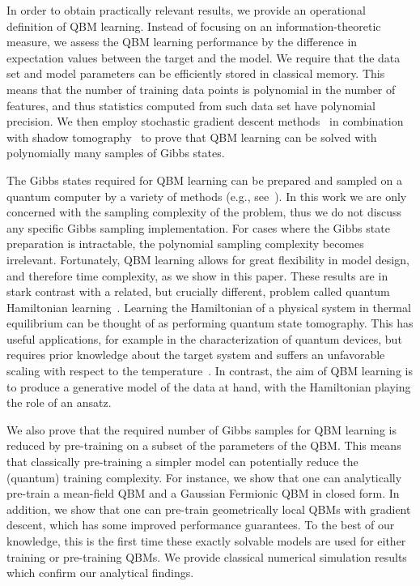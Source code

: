 \documentclass[
    aps,
    prx,
    floatfix,
    nofootinbib,
    onecolumn
]{revtex4-2}
\begin{document}
In order to obtain practically relevant results, we provide an operational definition of QBM learning. Instead of focusing on an information-theoretic measure, we assess the QBM learning performance by the difference in expectation values between the target and the model. We require that the data set and model parameters can be efficiently stored in classical memory. This means that the number of training data points is polynomial in the number of features, and thus statistics computed from such data set have polynomial precision. We then employ stochastic gradient descent methods~\cite{Khaled2020, Garrigos2023} in combination with shadow tomography~\cite{Aaronson_2017, Huang_2021, Rouze_2023} to prove that QBM learning can be solved with polynomially many samples of Gibbs states. 

The Gibbs states required for QBM learning can be prepared and sampled on a quantum computer by a variety of methods (e.g., see~\cite{Temme_2011, Chowdhury_2016, Holmes_2022, chifang2023quantum, zhang2023dissipative, Coopmans_2023}). In this work we are only concerned with the sampling complexity of the problem, thus we do not discuss any specific Gibbs sampling implementation. For cases where the Gibbs state preparation is intractable, the polynomial sampling complexity becomes irrelevant. Fortunately, QBM learning allows for great flexibility in model design, and therefore time complexity, as we show in this paper. These results are in stark contrast with a related, but crucially different, problem called quantum Hamiltonian learning~\cite{Wiebe_2014, Anshu_2021, Haah_2022, Onorati_2023}. Learning the Hamiltonian of a physical system in thermal equilibrium can be thought of as performing quantum state tomography. This has useful applications, for example in the characterization of quantum devices, but requires prior knowledge about the target system and suffers an unfavorable scaling with respect to the temperature~\cite{Anshu_2021}. In contrast, the aim of QBM learning is to produce a generative model of the data at hand, with the Hamiltonian playing the role of an ansatz.

We also prove that the required number of Gibbs samples for QBM learning is reduced by pre-training on a subset of the parameters of the QBM. This means that classically pre-training a simpler model can potentially reduce the (quantum) training complexity. For instance, we show that one can analytically pre-train a mean-field QBM and a Gaussian Fermionic QBM in closed form. In addition, we show that one can pre-train geometrically local QBMs with gradient descent, which has some improved performance guarantees. To the best of our knowledge, this is the first time these exactly solvable models are used for either training or pre-training QBMs. We provide classical numerical simulation results which confirm our analytical findings. 
\end{document}
